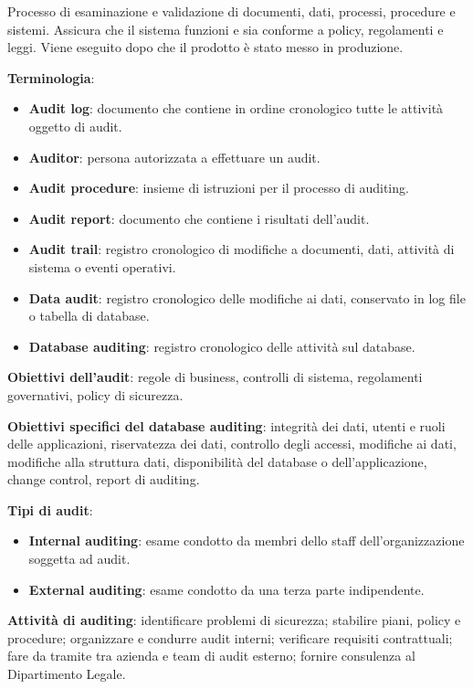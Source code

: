 \documentclass[a4paper,11pt]{article}
\begin{document}
\begin{definizione}[Auditing]
Processo di esaminazione e validazione di documenti, dati, processi, procedure e sistemi. Assicura che il sistema funzioni e sia conforme a policy, regolamenti e leggi. Viene eseguito dopo che il prodotto è stato messo in produzione.

\textbf{Terminologia}:
\begin{itemize}
  \item \textbf{Audit log}: documento che contiene in ordine cronologico tutte le attività oggetto di audit.
  \item \textbf{Auditor}: persona autorizzata a effettuare un audit.
  \item \textbf{Audit procedure}: insieme di istruzioni per il processo di auditing.
  \item \textbf{Audit report}: documento che contiene i risultati dell'audit.
  \item \textbf{Audit trail}: registro cronologico di modifiche a documenti, dati, attività di sistema o eventi operativi.
  \item \textbf{Data audit}: registro cronologico delle modifiche ai dati, conservato in log file o tabella di database.
  \item \textbf{Database auditing}: registro cronologico delle attività sul database.
\end{itemize}

\textbf{Obiettivi dell'audit}: regole di business, controlli di sistema, regolamenti governativi, policy di sicurezza.

\textbf{Obiettivi specifici del database auditing}: integrità dei dati, utenti e ruoli delle applicazioni, riservatezza dei dati, controllo degli accessi, modifiche ai dati, modifiche alla struttura dati, disponibilità del database o dell'applicazione, change control, report di auditing.

\textbf{Tipi di audit}:
\begin{itemize}
  \item \textbf{Internal auditing}: esame condotto da membri dello staff dell'organizzazione soggetta ad audit.
  \item \textbf{External auditing}: esame condotto da una terza parte indipendente.
\end{itemize}

\textbf{Attività di auditing}: identificare problemi di sicurezza; stabilire piani, policy e procedure; organizzare e condurre audit interni; verificare requisiti contrattuali; fare da tramite tra azienda e team di audit esterno; fornire consulenza al Dipartimento Legale.


\end{definizione}
\end{document}

